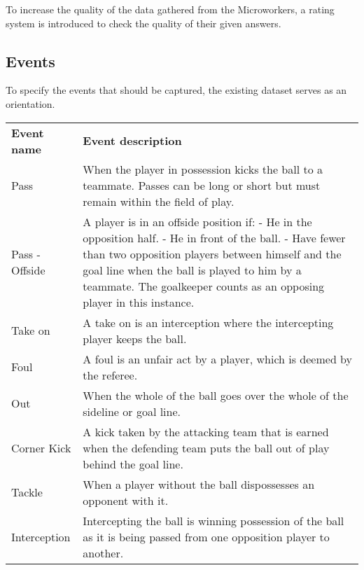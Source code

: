 To increase the quality of the data gathered from the Microworkers, a rating system is introduced to check the quality of their given answers.

\subsection{Events}

To specify the events that should be captured, the existing dataset serves as an orientation.

\begin{table}[H]
    \centering
    \resizebox{\textwidth}{!} {
	\begin{tabular}{p{5cm}p{14cm}}
        \textbf{Event name} & \textbf{Event description}\\
		\hhline{==}
        \rowcolor{gray!30}
        	Pass & When the player in possession kicks the ball to a teammate. Passes can be long or short but must remain within the field of play.\\ 
        	\hline
	    Pass - Offside & A player is in an offside position if: \newline- He in the opposition half. \newline - He in front of the ball. \newline - Have fewer than two opposition players between himself and the goal line when the ball is played to him by a teammate. \newline The goalkeeper counts as an opposing player in this instance.\\
        	\hline
   	    Take on & A take on is an interception where the intercepting player keeps the ball.\\
        	\hline
        \rowcolor{gray!30}
	    Foul & A foul is an unfair act by a player, which is deemed by the referee.\\
        	\hline
        \rowcolor{gray!30}
	    Out & When the whole of the ball goes over the whole of the sideline or goal line.\\
        	\hline
        \rowcolor{gray!30}
	    Corner Kick & A kick taken by the attacking team that is earned when the defending team puts the ball out of play behind the goal line.\\
        	\hline
        \rowcolor{gray!30}
	    Tackle & When a player without the ball dispossesses an opponent with it.\\
        	\hline
        \rowcolor{gray!30}
	    Interception & Intercepting the ball is winning possession of the ball as it is being passed from \newline one opposition player to another.\\

\end{tabular}}
\end{table}
